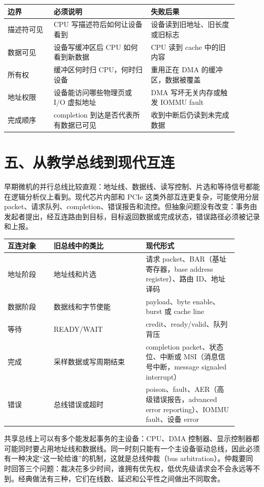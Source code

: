 \begin{longtable}{L{0.18\linewidth}L{0.38\linewidth}L{0.34\linewidth}}
\toprule
边界 & 必须说明 & 失败后果 \\
\midrule
描述符可见 & CPU 写描述符后如何让设备看到 & 设备读到旧地址、旧长度或旧标志 \\
数据可见 & 设备写缓冲区后 CPU 如何看到新数据 & CPU 读到 cache 中的旧内容 \\
所有权 & 缓冲区何时归 CPU，何时归设备 & 重用正在 DMA 的缓冲区，数据被覆盖 \\
地址权限 & 设备能访问哪些物理页或 I/O 虚拟地址 & DMA 写坏无关内存或触发 IOMMU fault \\
完成顺序 & completion 到达是否代表所有数据已可见 & 收到中断后仍读到未完成数据 \\
\bottomrule
\end{longtable}

\section{五、从教学总线到现代互连}

早期微机的并行总线比较直观：地址线、数据线、读写控制、片选和等待信号都能在逻辑分析仪上看到。现代芯片内部和 PCIe 这类外部互连更复杂，可能使用分层 packet、请求队列、completion、错误报告和流控。但抽象问题没有改变：事务由发起者提出，经互连路由到目标，目标返回数据或完成状态，错误路径必须被记录和上报。

\begin{longtable}{L{0.18\linewidth}L{0.36\linewidth}L{0.36\linewidth}}
\toprule
互连对象 & 旧总线中的类比 & 现代形式 \\
\midrule
地址阶段 & 地址线和片选 & 请求 packet、BAR（基址寄存器，base address register）、路由 ID、地址译码 \\
数据阶段 & 数据线和字节使能 & payload、byte enable、burst 或 cache line \\
等待 & READY/WAIT & credit、ready/valid、队列背压 \\
完成 & 采样数据或写周期结束 & completion packet、状态位、中断或 MSI（消息信号中断，message signaled interrupt） \\
错误 & 总线错误或超时 & poison、fault、AER（高级错误报告，advanced error reporting）、IOMMU fault、设备 error \\
\bottomrule
\end{longtable}

共享总线上可以有多个能发起事务的主设备：CPU、DMA 控制器、显示控制器都可能同时要占用地址线和数据线。同一时刻只能有一个主设备驱动总线，因此必须有一种决定“这一轮给谁”的机制，这就是总线仲裁（bus arbitration）。仲裁要同时回答三个问题：裁决花多少时间，谁拥有优先权，低优先级请求会不会永远等不到。经典做法有三种，它们在线数、延迟和公平性之间做出不同取舍。

